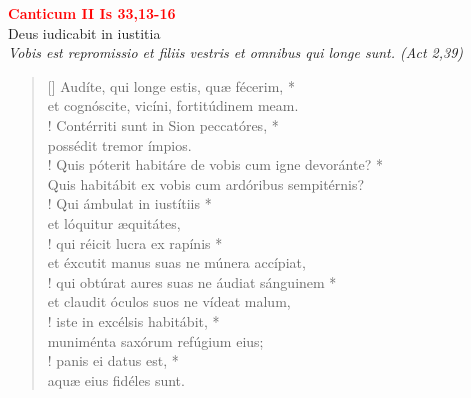 


\def\greinitialformat#1{%
{\fontsize{39}{39}\selectfont #1}%
}




\vspace{0.3cm}
\begin{center}
 \textcolor{red}{\large \bf Canticum II Is 33,13-16}\\
Deus iudicabit in iustitia\\
\textit{\small Vobis est repromissio et filiis vestris et omnibus qui longe sunt. (Act 2,39)}
\end{center}
\begin{verse}[\versewidth]
Audíte, qui longe estis, quæ fécerim, *\\
et cognóscite, vicíni, fortitúdinem meam.\\!
\vin Contérriti sunt in Sion peccatóres, *\\
\vin possédit tremor ímpios.\\!
Quis póterit habitáre de vobis cum igne devoránte? *\\
Quis habitábit ex vobis cum ardóribus sempitérnis?\\!
\vin Qui ámbulat in iustítiis *\\
\vin et lóquitur æquitátes,\\!
qui réicit lucra ex rapínis *\\
et éxcutit manus suas ne múnera accípiat,\\!
\vin qui obtúrat aures suas ne áudiat sánguinem *\\
\vin et claudit óculos suos ne vídeat malum,\\!
iste in excélsis habitábit, *\\
muniménta saxórum refúgium eius;\\!
\vin panis ei datus est, *\\
\vin aquæ eius fidéles sunt.\\
\end{verse}
\vspace{1cm}


